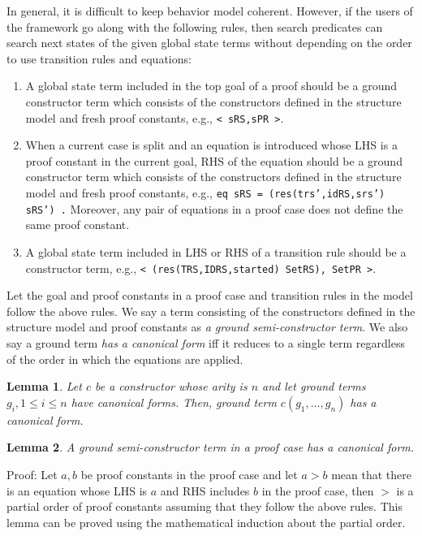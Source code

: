 \documentclass[12pt]{report}
\newtheorem{lemma}{Lemma}
\newcommand{\stt}[1]{{\small{\tt {#1}}}}
\begin{document}
In general, it is difficult to keep behavior model coherent. However,
if the users of the framework go along with the following rules, then
search predicates can search next states of the given global state
terms without depending on the order to use transition rules and
equations:
\begin{enumerate}
\item A global state term included in the top goal of a proof should
  be a ground constructor term which consists of the constructors defined
  in the structure model and fresh proof constants, e.g., \stt{< sRS,sPR >}.
\item When a current case is split and an equation is introduced whose
  LHS is a proof constant in the current goal, RHS of the equation
  should be a ground constructor term which consists of the
  constructors defined in the structure model and fresh proof
  constants, e.g., \stt{eq sRS = (res(trs',idRS,srs') sRS') .}
  Moreover, any pair of equations in a proof case does not define the
  same proof constant.
\item A global state term included in LHS or RHS of a transition rule
  should be a constructor term, e.g., \stt{< (res(TRS,IDRS,started)
    SetRS), SetPR >}.
\end{enumerate}
Let the goal and proof constants in a proof case and transition rules
in the model follow the above rules. We say a term consisting of the
constructors defined in the structure model and proof constants as
{\it a ground semi-constructor term}.  We also say a ground term {\it
  has a canonical form} iff it reduces to a single term regardless of
the order in which the equations are applied.
\begin{lemma}
\label{def:allcano}
  Let $c$ be a constructor whose arity is $n$ and let ground terms
  $g_i, 1\le i\le n$ have canonical forms. Then, ground term
  $c(g_1,\dots,g_n)$ has a canonical form.
\end{lemma}
\begin{lemma}
  A ground semi-constructor term in a proof case has a canonical form.
\end{lemma}
Proof: Let $a, b$ be proof constants in the proof case and let $a > b$
mean that there is an equation whose LHS is $a$ and RHS includes $b$
in the proof case, then $>$ is a partial order of proof constants
assuming that they follow the above rules. This lemma can be proved
using the mathematical induction about the partial order.
\vspace{-0.3cm}
\end{document}
